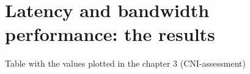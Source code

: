 \chapter{Latency and bandwidth performance: the results}

Table with the values plotted in the chapter 3 (CNI-assessment)
